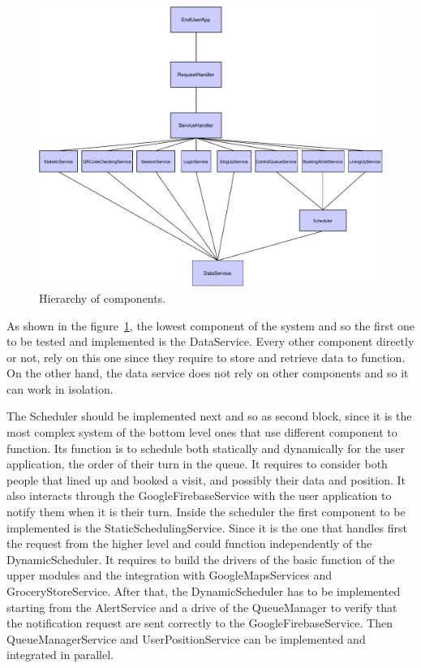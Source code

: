 \begin{figure}[H]
    \centering
    \includegraphics[width=1.0\textwidth]{images/component_hierarchy.pdf}
    \caption{Hierarchy of components.}\label{fig:hierarchyOfComponent}
\end{figure}

As shown in the figure~\ref{fig:hierarchyOfComponent}, the lowest component of the system and so the first one to be tested and implemented is the DataService. Every other component directly or not, rely on this one since they require to store and retrieve data to function. On the other hand, the data service does not rely on other components and so it can work in isolation.

The Scheduler should be implemented next and so as second block, since it is the most complex system of the bottom level ones that use different component to function. Its function is to schedule both statically and dynamically for the user application, the order of their turn in the queue. It requires to consider both people that lined up and booked a visit, and possibly their data and position. It also interacts through the GoogleFirebaseService with the user application to notify them when it is their turn.
Inside the scheduler the first component to be implemented is the StaticSchedulingService. Since it is the one that handles first the request from the higher level and could function independently of the DynamicScheduler. It requires to build the drivers of the basic function of the upper modules and the integration with GoogleMapsServices and GroceryStoreService. After that, the DynamicScheduler has to be implemented starting from the AlertService and a drive of the QueueManager to verify that the notification request are sent correctly to the GoogleFirebaseService. Then QueueManagerService and UserPositionService can be implemented and integrated in parallel.

